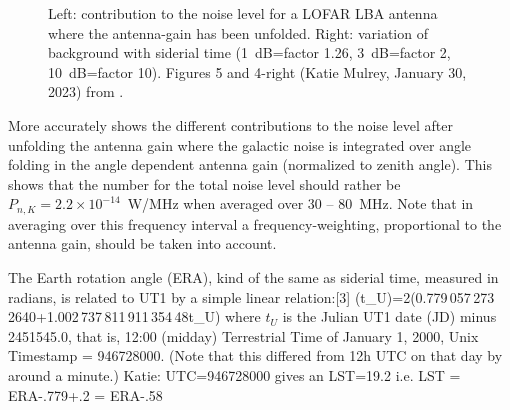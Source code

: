 \begin{figure}[th]
	\caption{Left: contribution to the noise level for a LOFAR LBA antenna where the antenna-gain has been unfolded. Right: variation of background with siderial time (1~dB=factor 1.26, 3~dB=factor 2, 10~dB=factor 10). Figures 5 and 4-right (Katie Mulrey, January 30, 2023) from \cite{Mulrey:2019}.}	 
\end{figure}

More accurately  shows the different contributions to the noise level after unfolding the antenna gain where the galactic noise is integrated over angle folding in the angle dependent antenna gain (normalized to zenith angle). This shows that the number for the total noise level should rather be $P_{n,K}=2.2\times 10^{-14}$~W/MHz when averaged over 30 -- 80~MHz. Note that in averaging over this frequency interval a frequency-weighting, proportional to the antenna gain, should be taken into account.


The Earth rotation angle (ERA), kind of the same as siderial time, measured in radians, is related to UT1 by a simple linear relation:[3]
\beq  \theta (t_{U})=2\pi (0.779\,057\,273\,2640+1.002\,737\,811\,911\,354\,48\cdot t_{U})
\eeq
where $t_U$ is the Julian UT1 date (JD) minus 2451545.0, that is, 12:00 (midday) Terrestrial Time of January 1, 2000, Unix Timestamp = 946728000. (Note that this differed from 12h UTC on that day by around a minute.)
Katie:  UTC=946728000 gives an LST=19.2 i.e. LST = ERA-.779+.2 = ERA-.58


